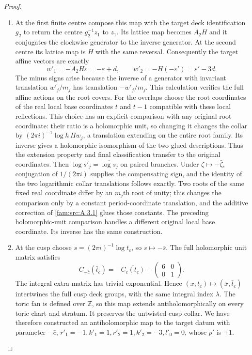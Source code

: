 \begin{proof}
\begin{enumerate}[label=\arabic*.,leftmargin=*]
\item At the first finite centre compose this map with the target deck identification $g_2$ to return the centre $g_2^{-1}z_1$ to $z_1$. Its lattice map becomes $A_2H$ and it conjugates the clockwise generator to the inverse generator. At the second centre its lattice map is $H$ with the same reversal. Consequently the target affine vectors are exactly
\[
 w'_1=-A_2H\varepsilon=-\varepsilon+d,\qquad
 w'_2=-H(-\varepsilon')=\varepsilon'-3d.
 \label{I:eq:real-reflected-affine-data}
\]
The minus signs arise because the inverse of a generator with invariant translation $w'_j/m_j$ has translation $-w'_j/m_j$. This calculation verifies the full affine actions on the root covers. For the overlaps choose the root coordinates of the real local base coordinates $t$ and $t-1$ compatible with these local reflections. This choice has an explicit comparison with any original root coordinate: their ratio is a holomorphic unit, so changing it changes the collar by $(2\pi i)^{-1}\log h\,\Pi w_j$, a translation extending on the entire root family. Its inverse gives a holomorphic isomorphism of the two glued descriptions. Thus the extension property and final classification transfer to the original coordinates. Then $\log s'_j=\overline{\log s_j}$ on paired branches. Under $\zeta\mapsto-\bar\zeta$, conjugation of $1/(2\pi i)$ supplies the compensating sign, and the identity of the two logarithmic collar translations follows exactly. Two roots of the same fixed real coordinate differ by an $m_j$th root of unity; this changes the comparison only by a constant period-coordinate translation, and the additive correction of \ref{fam:src:A.3.1} glues those constants. The preceding holomorphic-unit comparison handles a different original local base coordinate. Its inverse has the same construction.

\item At the cusp choose $s=(2\pi i)^{-1}\log t_c$, so $s\mapsto-\bar s$. The full holomorphic unit matrix satisfies
\[
 C_{-\bar c}(\bar t_c)=-\overline{C_c(t_c)}+
       \begin{pmatrix}6&0\\0&1\end{pmatrix}.
\]
The integral extra matrix has trivial exponential. Hence $(x,t_c)\mapsto(\bar x,\bar t_c)$ intertwines the full cusp deck groups, with the same integral index $\lambda$. The toric fan is defined over $\mathbb Z$, so this map extends antiholomorphically on every toric chart and stratum. It preserves the untwisted cusp collar. We have therefore constructed an antiholomorphic map to the target datum with parameter $-\bar c$, $r'_1=-1,k'_1=1,r'_2=1,k'_2=-3,l'_0=0$, whose $p'$ is $+1$.


\end{enumerate}
\end{proof}
